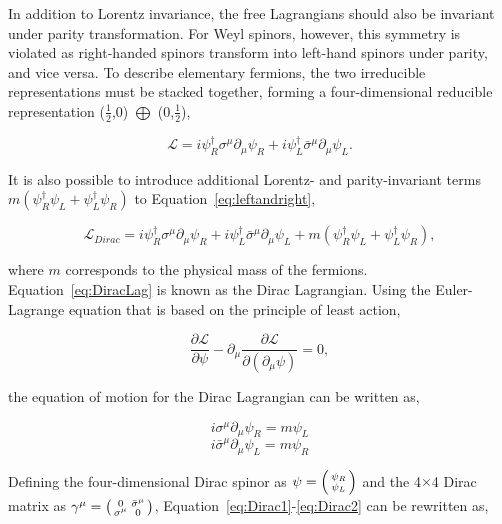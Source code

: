 In addition to Lorentz invariance, the free Lagrangians should also be invariant under parity transformation. For Weyl spinors, however, this symmetry is violated as right-handed spinors transform into left-hand spinors under parity, and vice versa. To describe elementary fermions, the two irreducible representations must be stacked together, forming a four-dimensional reducible representation ($\frac{1}{2}$,0) $\bigoplus$ (0,$\frac{1}{2}$),

\begin{equation}
\label{eq:leftandright}
\mathcal{L}=i\psi_{R}^{\dagger}\sigma^{\mu}\partial_{\mu}\psi_{R}+i\psi_{L}^{\dagger}\bar{\sigma}^{\mu}\partial_{\mu}\psi_{L}.
\end{equation}

It is also possible to introduce additional Lorentz- and parity-invariant terms $m(\psi_{R}^{\dagger}\psi_{L}+\psi_{L}^{\dagger}\psi_{R})$ to Equation~\ref{eq:leftandright},

\begin{equation}
\label{eq:DiracLag}
\mathcal{L}_{Dirac}=i\psi_{R}^{\dagger}\sigma^{\mu}\partial_{\mu}\psi_{R}+i\psi_{L}^{\dagger}\bar{\sigma}^{\mu}\partial_{\mu}\psi_{L}+m(\psi_{R}^{\dagger}\psi_{L}+\psi_{L}^{\dagger}\psi_{R}),
\end{equation}

where $m$ corresponds to the physical mass of the fermions. Equation~\ref{eq:DiracLag} is known as the Dirac Lagrangian. Using the Euler-Lagrange equation that is based on the principle of least action,

\begin{equation}
\frac{\partial\mathcal{L}}{\partial\psi}-\partial_{\mu}\frac{\partial\mathcal{L}}{\partial(\partial_{\mu}\psi)}=0,
\end{equation}

the equation of motion for the Dirac Lagrangian can be written as,

\begin{equation}
\label{eq:Dirac1}
i\sigma^{\mu}\partial_{\mu}\psi_{R}=m\psi_{L}
\end{equation}
\begin{equation}
\label{eq:Dirac2}
i\bar{\sigma}^{\mu}\partial_{\mu}\psi_{L}=m\psi_{R}
\end{equation}

Defining the four-dimensional Dirac spinor as $\psi=\begin{psmallmatrix}\psi_{R}\\\psi_{L}\end{psmallmatrix}$ and the 4$\times$4 Dirac matrix as $\gamma^{\mu}=\begin{psmallmatrix}0&\bar{\sigma}^{\mu}\\\sigma^{\mu}&0\end{psmallmatrix}$, Equation~\ref{eq:Dirac1}-\ref{eq:Dirac2} can be rewritten as,

